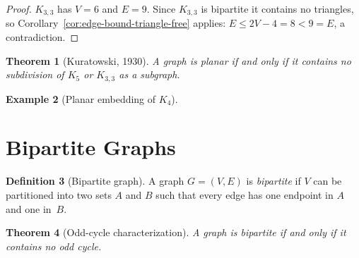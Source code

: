 \documentclass[12pt,a4paper,openany]{book}
\theoremstyle{definition}
\newtheorem{definition}{Definition}[chapter]
\newtheorem{example}[definition]{Example}
\theoremstyle{plain}
\newtheorem{theorem}[definition]{Theorem}
\theoremstyle{remark}
\begin{document}
\begin{proof}
$K_{3,3}$ has $V=6$ and $E=9$.  Since $K_{3,3}$ is bipartite it
contains no triangles, so Corollary~\ref{cor:edge-bound-triangle-free}
applies: $E\le 2V-4=8<9=E$, a contradiction.
\end{proof}

\begin{theorem}[Kuratowski, 1930]
\label{thm:kuratowski}
A graph is planar if and only if it contains no subdivision of $K_5$ or
$K_{3,3}$ as a subgraph.
\end{theorem}

\begin{example}[Planar embedding of $K_4$]
\label{ex:planar-K4}

\begin{center}
\end{center}
\end{example}


\section{Bipartite Graphs}
\label{sec:bipartite}

\begin{definition}[Bipartite graph]
\label{def:bipartite}
A graph $G=(V,E)$ is \emph{bipartite} if $V$ can be partitioned into
two sets $A$ and $B$ such that every edge has one endpoint in $A$ and
one in~$B$.
\end{definition}

\begin{theorem}[Odd-cycle characterization]
\label{thm:bipartite-char}
A graph is bipartite if and only if it contains no odd cycle.
\end{theorem}
\end{document}
